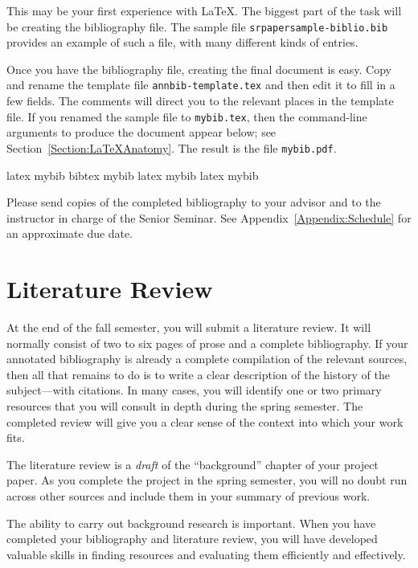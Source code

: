 \documentclass[finalcopy]{srpaper}
\def\hyperref[#1]{}
\let\plainref\ref
\newcommand{\plainref}{\ref*}
\newcommand{\namedref}[2]{\hyperref[#2]{#1~\plainref{#2}}}
\begin{document}
This may be your first experience with \LaTeX. The biggest
part of the task will be creating the bibliography file. 
The sample file
\texttt{srpaper\discretionary{-}{}{-}sample-biblio.bib}%
%
provides an example of such a file, with many different kinds
of entries.

Once you have the bibliography file, creating the final
document is easy. Copy and rename the template file
\texttt{annbib-template.tex}%
and then edit it to fill in a
few fields. The comments will direct you to the relevant
places in the template file. If you renamed the sample file
to \texttt{mybib.tex}, then the command-line arguments to
produce the document appear below; see
\namedref{Section}{Section:LaTeXAnatomy}. The result is the
file \texttt{mybib.pdf}.
\begin{code}
latex mybib
bibtex mybib
latex mybib
latex mybib
\end{code}
Please send copies of the completed bibliography to your
advisor and to the instructor in charge of the Senior
Seminar. See \namedref{Appendix}{Appendix:Schedule} for
an approximate 
due date.


\section{Literature Review}
\label{Section:LiteratureReview}
At the end of the fall semester, you will submit a
literature review. It will normally consist of two to six
pages of prose and a complete bibliography. If your
annotated bibliography is already a complete compilation of
the relevant sources, then all that remains to do is to
write a clear description of the history of the
subject---with citations.  In many cases, you will identify
one or two primary resources that you will consult in depth
during the spring semester. The completed review will give
you a clear sense of the context into which your work fits.

The literature review is a \emph{draft} of the
``background'' chapter of your project paper. As you
complete the project in the spring semester, you will no
doubt run across other sources and include them in your
summary of previous work.

The ability to carry out background research is
important. When you have completed your bibliography and
literature review, you will have developed valuable skills
in finding resources and evaluating them efficiently and
effectively.
\end{document}

